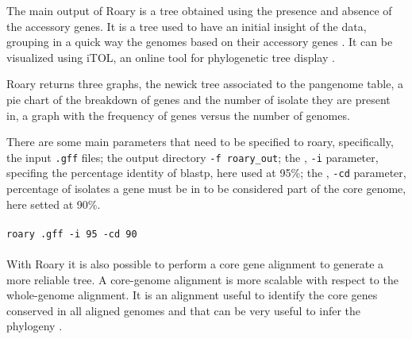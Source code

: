 \documentclass[a4paper,titlepage, oneside]{book}
\newcommand{\code}[1]{\colorbox{light-gray}{\texttt{#1}}}
\begin{document}
The main output of Roary is a tree obtained using the presence and absence of the accessory genes. It is a tree used to have an initial insight of the data, grouping in a quick way the genomes based on their accessory genes \cite{Roary}. It can be visualized using iTOL, an online tool for phylogenetic tree display \cite{iTOL}.

Roary returns three graphs, the newick tree associated to the pangenome table, a pie chart of the breakdown of genes and the number of isolate they are present in, a graph with the frequency of genes versus the number of genomes. \cite{Roary-outputs}


There are some main parameters that need to be specified to roary, specifically, the input \code{.gff} files; the output directory \code{-f roary\_out}; the , \code{-i} parameter, specifing the percentage identity of blastp, here used at 95\%; the , \code{-cd} parameter, percentage of isolates a gene must be in to be considered part of the core genome, here setted at 90\%.
\\ \newline \\ \code{roary .gff -i 95 -cd 90} \\ \newline \\


With Roary it is also possible to perform a core gene alignment to generate a more reliable tree. A core-genome alignment is more scalable with respect to the whole-genome alignment. It is an alignment useful to identify the core genes conserved in all aligned genomes and that can be very useful to infer the phylogeny \cite{Core-align}.
\end{document}
